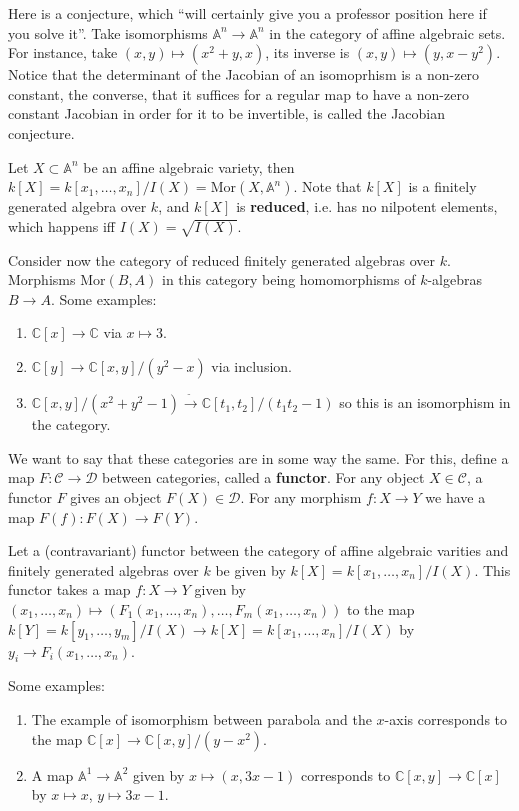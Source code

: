 \documentclass[12pt]{article}
\newcommand{\C}{\mathbb{C}}
\newcommand{\A}{\mathbb{A}}
\newcommand{\Mor}{\mathrm{Mor}}
\begin{document}
    Here is a conjecture, which ``will certainly give you a professor position here if you solve it''. Take isomorphisms $\A^n \to \A^n$ in the category of affine algebraic sets. For instance, take $(x, y) \mapsto (x^2 + y, x)$, its inverse is $(x, y) \mapsto (y, x-y^2)$. Notice that the determinant of the Jacobian of an isomoprhism is a non-zero constant, the converse, that it suffices for a regular map to have a non-zero constant Jacobian in order for it to be invertible, is called the Jacobian conjecture. \par 
    Let $X\subset \A^n$ be an affine algebraic variety, then $k[X] = k[x_1, \dots, x_n]/I(X) = \Mor(X, \A^n)$. Note that $k[X]$ is a finitely generated algebra over $k$, and $k[X]$ is \textbf{reduced}, i.e. has no nilpotent elements, which happens iff $I(X) = \sqrt{I(X)}$. \par 
    Consider now the category of reduced finitely generated algebras over $k$. Morphisms $\Mor(B, A)$ in this category being homomorphisms of $k$-algebras $B \to A$. Some examples:
    \begin{enumerate}
        \item $\C[x] \to \C$ via $x \mapsto 3$.
        \item $\C[y] \to \C[x, y]/(y^2 - x)$ via inclusion. 
        \item $\C[x, y]/(x^2+y^2-1) \xrightarrow{\widetilde{}} \C[t_1, t_2]/(t_1t_2 - 1)$ so this is an isomorphism in the category.
    \end{enumerate} 
    We want to say that these categories are in some way the same. For this, define a map $F: \mathcal{C} \to \mathcal{D}$ between categories, called a \textbf{functor}. For any object $X \in \mathcal{C}$, a functor $F$ gives an object $F(X) \in \mathcal{D}$. For any morphism $f: X \to Y$ we have a map $F(f): F(X) \to F(Y)$. \par 
    Let a (contravariant) functor between the category of affine algebraic varities and finitely generated algebras over $k$ be given by $k[X] = k[x_1, \dots, x_n]/I(X)$. This functor takes a map $f: X \to Y$ given by $(x_1, \dots, x_n) \mapsto (F_1(x_1, \dots, x_n), \dots, F_m(x_1, \dots, x_n))$ to the map $k[Y] = k[y_1, \dots, y_m]/I(X) \to k[X] = k[x_1, \dots, x_n]/I(X)$ by $y_i \to F_i(x_1, \dots, x_n)$. \par 
    Some examples: 
    \begin{enumerate}
        \item The example of isomorphism between parabola and the $x$-axis corresponds to the map $\C[x] \to \C[x, y]/(y-x^2)$. 
        \item A map $\A^1 \to \A^2$ given by $x \mapsto (x, 3x-1)$ corresponds to $\C[x, y] \to \C[x]$ by $x \mapsto x$, $y \mapsto 3x-1$. 
    \end{enumerate}
\end{document}
